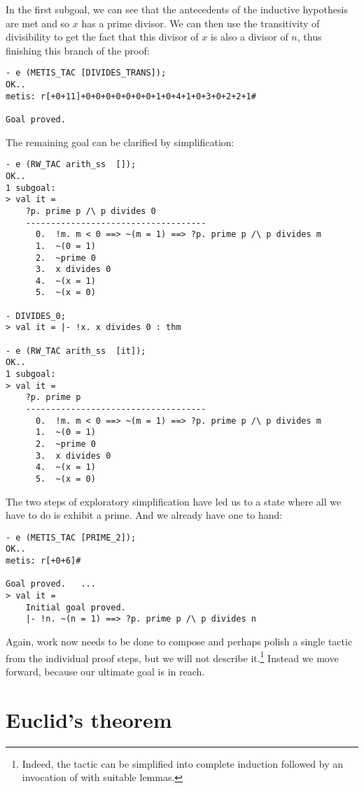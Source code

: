 In the first subgoal, we can see that the antecedents of the inductive
hypothesis are met and so $x$ has a prime divisor. We can then use the
transitivity of divisibility to get the fact that this divisor of $x$ is
also a divisor of $n$, thus finishing this branch of the proof:
\begin{session}
\begin{verbatim}
- e (METIS_TAC [DIVIDES_TRANS]);
OK..
metis: r[+0+11]+0+0+0+0+0+0+0+1+0+4+1+0+3+0+2+2+1#

Goal proved.
\end{verbatim}
\end{session}
\noindent The remaining goal can be clarified by simplification:
\begin{session}
\begin{verbatim}
- e (RW_TAC arith_ss  []);
OK..
1 subgoal:
> val it =
    ?p. prime p /\ p divides 0
    ------------------------------------
      0.  !m. m < 0 ==> ~(m = 1) ==> ?p. prime p /\ p divides m
      1.  ~(0 = 1)
      2.  ~prime 0
      3.  x divides 0
      4.  ~(x = 1)
      5.  ~(x = 0)

- DIVIDES_0;
> val it = |- !x. x divides 0 : thm

- e (RW_TAC arith_ss  [it]);
OK..
1 subgoal:
> val it =
    ?p. prime p
    ------------------------------------
      0.  !m. m < 0 ==> ~(m = 1) ==> ?p. prime p /\ p divides m
      1.  ~(0 = 1)
      2.  ~prime 0
      3.  x divides 0
      4.  ~(x = 1)
      5.  ~(x = 0)
\end{verbatim}
\end{session}
The two steps of exploratory simplification have led us to a state where
all we have to do is exhibit a prime. And we already have one to hand:
\begin{session}
\begin{verbatim}
- e (METIS_TAC [PRIME_2]);
OK..
metis: r[+0+6]#

Goal proved.   ...
> val it =
    Initial goal proved.
    |- !n. ~(n = 1) ==> ?p. prime p /\ p divides n
\end{verbatim}
\end{session}
Again, work now needs to be done to compose and perhaps polish a single
tactic from the individual proof steps, but we will not describe
it.\footnote{Indeed, the tactic can be simplified into complete induction
 followed by an invocation of  with suitable lemmas.}
 Instead we move forward, because our ultimate goal is in reach.

\section{Euclid's theorem}

